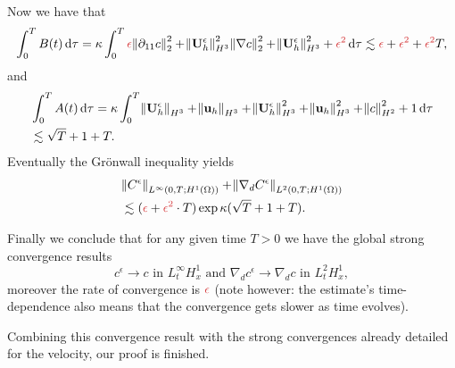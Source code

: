 \documentclass{beamer}
\newcommand*\diff{\mathop{}\!\mathrm{d}}
\begin{document}
\begin{frame}
Now we have that
%
\changefontsizes{10pt}
\[ \int_0^T B(t) \diff \tau = \kappa \int_0^T \textcolor{jasper}{\epsilon} \norm{\partial_{11} c}_2^2 + \norm{\mathbf{U}_h^\epsilon}_{H^3}^2 \norm{\nabla c}_2^2 + \norm{\mathbf{U}_h^\epsilon}_{H^3}^2 + \textcolor{jasper}{\epsilon^2} \diff \tau \lesssim \textcolor{jasper}{\epsilon} + \textcolor{jasper}{\epsilon^2} + \textcolor{jasper}{\epsilon^2} T,\]
\changefontsizes{12pt}
%
and
%
\changefontsizes{10pt}
\begin{equation} \nonumber
\begin{split}
& \int_0^T A(t) \diff \tau = \kappa \int_0^T \norm{\mathbf{U}_h^\epsilon}_{H^3} + \norm{\mathbf{u}_h}_{H^3} + \norm{\mathbf{U}_h^\epsilon}_{H^3}^2 + \norm{\mathbf{u}_h}_{H^3}^2 + \norm{c}_{H^2}^2 + 1 \diff \tau \\
& \lesssim \sqrt{T} + 1 + T.
\end{split}
\end{equation}
\changefontsizes{12pt}
%
Eventually the Gr\"onwall inequality yields
%
\begin{equation} \nonumber
\begin{split}
& \norm{C^\epsilon}_{L^\infty(0,T; H^1(\Omega))} + \norm{\nabla_d C^\epsilon}_{L^2(0,T; H^1(\Omega))} \\
& \lesssim (\textcolor{jasper}{\epsilon} + \textcolor{jasper}{\epsilon^2} \cdot T) \exp{\kappa (\sqrt{T} + 1 + T)}.
\end{split}
\end{equation}
\end{frame}

\begin{frame}
Finally we conclude that for any given time $T > 0$ we have the global strong convergence results
%
\begin{equation} \nonumber
c^\epsilon \to c \text{ in } L_t^\infty H_x^1 \text{ and } \nabla_d c^\epsilon \to \nabla_d c \text{ in } L_t^2 H_x^1,
\end{equation}
%
moreover the rate of convergence is $\textcolor{jasper}{\epsilon}$ (note however: the estimate's time-dependence also means that the convergence gets slower as time evolves).

Combining this convergence result with the strong convergences already detailed for the velocity, our proof is finished.
\end{frame}
\end{document}
